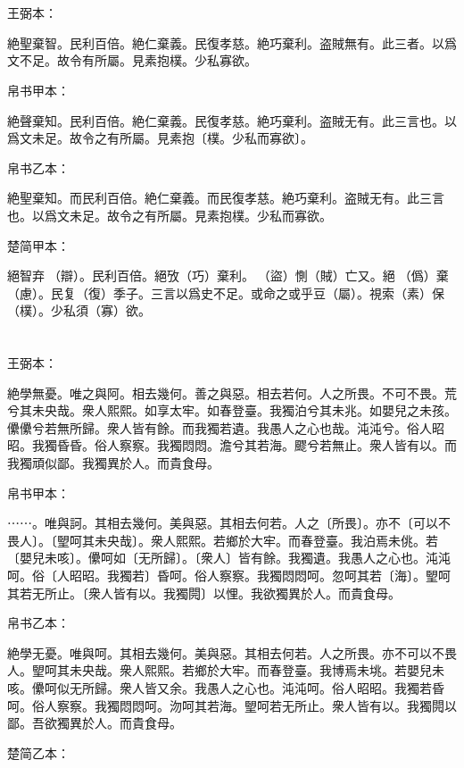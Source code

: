 \documentclass[a5paper]{ctexbook}
\begin{document}
    \chapter{}
    王弼本：

    絶聖棄智。民利百倍。絶仁棄義。民復孝慈。絶巧棄利。盗賊無有。此三者。以爲文不足。故令有所屬。見素抱樸。少私寡欲。

    
    帛书甲本：

    絶聲棄知。民利百倍。絶仁棄義。民復孝慈。絶巧棄利。盗賊无有。此三言也。以爲文未足。故令之有所屬。見素抱〔樸。少私而寡欲〕。

    帛书乙本：

    絶聖棄知。而民利百倍。絶仁棄義。而民復孝慈。絶巧棄利。盗賊无有。此三言也。以爲文未足。故令之有所屬。見素抱樸。少私而寡欲。

    楚简甲本：

    絕智弃󶴉（辯）。民利百倍。絕攷（巧）棄利。󶴊（盜）惻（賊）亡又。絕𢠿（僞）棄󶴍（慮）。民复（復）季子。三言以爲史不足。或命之或乎豆（屬）。視索（素）保󶴏（樸）。少私須（寡）欲。

    \chapter{}
    王弼本：

    絶學無憂。唯之與阿。相去幾何。善之與惡。相去若何。人之所畏。不可不畏。荒兮其未央哉。衆人熙熙。如享太牢。如春登臺。我獨泊兮其未兆。如嬰兒之未孩。儽儽兮若無所歸。衆人皆有餘。而我獨若遺。我愚人之心也哉。沌沌兮。俗人昭昭。我獨昏昏。俗人察察。我獨悶悶。澹兮其若海。飂兮若無止。衆人皆有以。而我獨頑似鄙。我獨異於人。而貴食母。

    
    帛书甲本：

    ⋯⋯。唯與訶。其相去幾何。美與惡。其相去何若。人之〔所畏〕。亦不〔可以不畏人〕。〔朢呵其未央哉〕。衆人熙熙。若鄉於大牢。而春登臺。我泊焉未佻。若〔嬰兒未咳〕。儽呵如〔无所歸〕。〔衆人〕皆有餘。我獨遺。我愚人之心也。沌沌呵。俗〔人昭昭。我獨若〕昏呵。俗人察察。我獨悶悶呵。忽呵其若〔海〕。朢呵其若无所止。〔衆人皆有以。我獨䦎〕以悝。我欲獨異於人。而貴食母。

    帛书乙本：

    絶學无憂。唯與呵。其相去幾何。美與惡。其相去何若。人之所畏。亦不可以不畏人。朢呵其未央哉。衆人熙熙。若鄉於大牢。而春登臺。我博焉未垗。若嬰兒未咳。儽呵似无所歸。衆人皆又余。我愚人之心也。沌沌呵。俗人昭昭。我獨若昏呵。俗人察察。我獨悶悶呵。沕呵其若海。朢呵若无所止。衆人皆有以。我獨䦎以鄙。吾欲獨異於人。而貴食母。

    楚简乙本：
\end{document}
